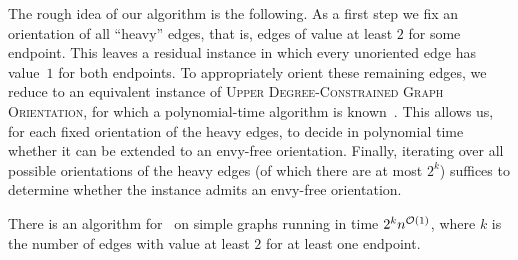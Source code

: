 The rough idea of our algorithm is the following.
As a first step we fix an orientation of all ``heavy'' edges, that is, edges of value at least $2$ for some endpoint.
This leaves a residual instance in which every unoriented edge has value~$1$ for both endpoints.
To appropriately orient these remaining edges, we reduce to an equivalent instance of
\textsc{Upper Degree-Constrained Graph Orientation}, for which a polynomial-time algorithm is known~\cite{FrankGyarfas1978}.
This allows us, for each fixed orientation of the heavy edges, to decide in polynomial time
whether it can be extended to an envy-free orientation.
Finally, iterating over all possible orientations of the heavy edges (of which there are at most $2^k$)
suffices to determine whether the instance admits an envy-free orientation.

%

\begin{theoremrep}[\appsymb]\label{thm:EFo:Heavy}
    There is an algorithm
    for \EFo\ on simple graphs running in time $2^k n^{\mathcal{O}(1)}$, where $k$ is the number of edges with value at least $2$ for at least one endpoint.
\end{theoremrep}

